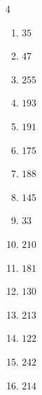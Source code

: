 \begin{multicols}{4}
\begin{enumerate}
  \item $35$


  \item $47$


  \item $255$


  \item $193$


  \item $191$


  \item $175$


  \item $188$


  \item $145$


  \item $33$


\columnbreak %

  \item $210$


  \item $181$


  \item $130$


  \item $213$


  \item $122$


  \item $242$


  \item $214$


\end{enumerate}
\end{multicols}
